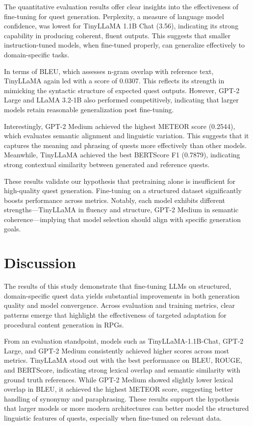 The quantitative evaluation results offer clear insights into the effectiveness of fine-tuning
for quest generation. Perplexity, a measure of language model confidence, was lowest
for TinyLLaMA 1.1B Chat (3.56), indicating its strong capability in producing
coherent, fluent outputs. This suggests that smaller instruction-tuned models, when fine-tuned
properly, can generalize effectively to domain-specific tasks.

In terms of BLEU, which assesses n-gram overlap with reference text, TinyLLaMA
again led with a score of 0.0307. This reflects its strength in mimicking the syntactic
structure of expected quest outputs. However, GPT-2 Large and LLaMA 3.2-1B also
performed competitively, indicating that larger models retain reasonable generalization
post fine-tuning.

Interestingly, GPT-2 Medium achieved the highest METEOR score (0.2544), which
evaluates semantic alignment and linguistic variation. This suggests that it captures the
meaning and phrasing of quests more effectively than other models. Meanwhile, TinyLLaMA
achieved the best BERTScore F1 (0.7879), indicating strong contextual similarity
between generated and reference quests.

These results validate our hypothesis that pretraining alone is insufficient for high-quality
quest generation. Fine-tuning on a structured dataset significantly boosts performance
across metrics. Notably, each model exhibits different strengths—TinyLLaMA
in fluency and structure, GPT-2 Medium in semantic coherence—implying that model
selection should align with specific generation goals.

\section{Discussion}

The results of this study demonstrate that fine-tuning LLMs on structured, domain-specific
quest data yields substantial improvements in both generation quality and model
convergence. Across evaluation and training metrics, clear patterns emerge that highlight
the effectiveness of targeted adaptation for procedural content generation in RPGs.

From an evaluation standpoint, models such as TinyLLaMA-1.1B-Chat, GPT-2 Large,
and GPT-2 Medium consistently achieved higher scores across most metrics. TinyLLaMA
stood out with the best performance on BLEU, ROUGE, and BERTScore, indicating
strong lexical overlap and semantic similarity with ground truth references. While GPT-2
Medium showed slightly lower lexical overlap in BLEU, it achieved the highest METEOR
score, suggesting better handling of synonymy and paraphrasing. These results support
the hypothesis that larger models or more modern architectures can better model the
structured linguistic features of quests, especially when fine-tuned on relevant data.

